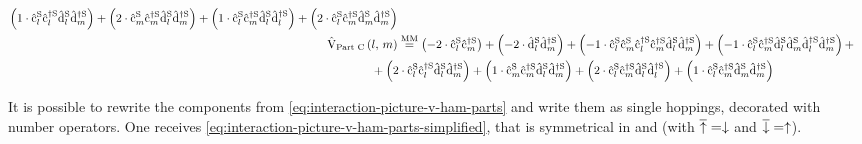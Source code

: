 \begin{equation}
\begin{split}
            \left(1 \cdot \cop[\schroedingerPicture]{l}{}\cop[\schroedingerPicture]{l}{\dagger}\dop[\schroedingerPicture]{l}{}\dop[\schroedingerPicture]{m}{\dagger}\right)
            +
            \left(2 \cdot \cop[\schroedingerPicture]{m}{}\cop[\schroedingerPicture]{m}{\dagger}\dop[\schroedingerPicture]{l}{}\dop[\schroedingerPicture]{m}{\dagger}\right)
            +
            \left(1 \cdot \cop[\schroedingerPicture]{l}{}\cop[\schroedingerPicture]{m}{\dagger}\dop[\schroedingerPicture]{l}{}\dop[\schroedingerPicture]{l}{\dagger}\right)
            +
            \left(2 \cdot \cop[\schroedingerPicture]{l}{}\cop[\schroedingerPicture]{m}{\dagger}\dop[\schroedingerPicture]{m}{}\dop[\schroedingerPicture]{m}{\dagger}\right)
        \\
        \VhamiltonianPartC{l}{m} &\stackrel{\text{MM}}{=} 
            \left(-2 \cdot \cop[\schroedingerPicture]{l}{}\cop[\schroedingerPicture]{m}{\dagger}\right)
            +
            \left(-2 \cdot \dop[\schroedingerPicture]{l}{}\dop[\schroedingerPicture]{m}{\dagger}\right)
            +
            \left(-1 \cdot \cop[\schroedingerPicture]{l}{}\cop[\schroedingerPicture]{m}{}\cop[\schroedingerPicture]{l}{\dagger}\cop[\schroedingerPicture]{m}{\dagger}\dop[\schroedingerPicture]{l}{}\dop[\schroedingerPicture]{m}{\dagger}\right)
            +
            \left(-1 \cdot \cop[\schroedingerPicture]{l}{}\cop[\schroedingerPicture]{m}{\dagger}\dop[\schroedingerPicture]{l}{}\dop[\schroedingerPicture]{m}{}\dop[\schroedingerPicture]{l}{\dagger}\dop[\schroedingerPicture]{m}{\dagger}\right)
            +\\&\mkern-40mu+
            \left(2 \cdot \cop[\schroedingerPicture]{l}{}\cop[\schroedingerPicture]{l}{\dagger}\dop[\schroedingerPicture]{l}{}\dop[\schroedingerPicture]{m}{\dagger}\right)
            +
            \left(1 \cdot \cop[\schroedingerPicture]{m}{}\cop[\schroedingerPicture]{m}{\dagger}\dop[\schroedingerPicture]{l}{}\dop[\schroedingerPicture]{m}{\dagger}\right)
            +
            \left(2 \cdot \cop[\schroedingerPicture]{l}{}\cop[\schroedingerPicture]{m}{\dagger}\dop[\schroedingerPicture]{l}{}\dop[\schroedingerPicture]{l}{\dagger}\right)
            +
            \left(1 \cdot \cop[\schroedingerPicture]{l}{}\cop[\schroedingerPicture]{m}{\dagger}\dop[\schroedingerPicture]{m}{}\dop[\schroedingerPicture]{m}{\dagger}\right)
        \\
    \end{split}
\end{equation}

It is possible to rewrite the components from \autoref{eq:interaction-picture-v-ham-parts} and write them as single hoppings, decorated with  number operators. One receives \autoref{eq:interaction-picture-v-ham-parts-simplified}, that is symmetrical in \up and \down (with $\overline{\uparrow} = \downarrow$ and  $\overline{\downarrow} = \uparrow$).

